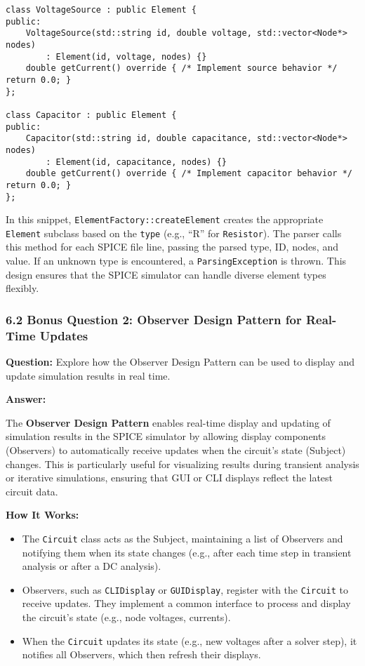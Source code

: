 \documentclass{article}
\begin{document}
\begin{itemize}
\begin{verbatim}
class VoltageSource : public Element {
public:
    VoltageSource(std::string id, double voltage, std::vector<Node*> nodes)
        : Element(id, voltage, nodes) {}
    double getCurrent() override { /* Implement source behavior */ return 0.0; }
};

class Capacitor : public Element {
public:
    Capacitor(std::string id, double capacitance, std::vector<Node*> nodes)
        : Element(id, capacitance, nodes) {}
    double getCurrent() override { /* Implement capacitor behavior */ return 0.0; }
};
\end{verbatim}

In this snippet, \texttt{ElementFactory::createElement} creates the appropriate \texttt{Element} subclass based on the \texttt{type} (e.g., “R” for \texttt{Resistor}). The parser calls this method for each SPICE file line, passing the parsed type, ID, nodes, and value. If an unknown type is encountered, a \texttt{ParsingException} is thrown. This design ensures that the SPICE simulator can handle diverse element types flexibly.

\subsubsection*{6.2 Bonus Question 2: Observer Design Pattern for Real-Time Updates}

\textbf{Question:} Explore how the Observer Design Pattern can be used to display and update simulation results in real time.

\textbf{Answer:}

The \textbf{Observer Design Pattern} enables real-time display and updating of simulation results in the SPICE simulator by allowing display components (Observers) to automatically receive updates when the circuit’s state (Subject) changes. This is particularly useful for visualizing results during transient analysis or iterative simulations, ensuring that GUI or CLI displays reflect the latest circuit data.

\textbf{How It Works:}
\begin{itemize}
    \item The \texttt{Circuit} class acts as the Subject, maintaining a list of Observers and notifying them when its state changes (e.g., after each time step in transient analysis or after a DC analysis).
    \item Observers, such as \texttt{CLIDisplay} or \texttt{GUIDisplay}, register with the \texttt{Circuit} to receive updates. They implement a common interface to process and display the circuit’s state (e.g., node voltages, currents).
    \item When the \texttt{Circuit} updates its state (e.g., new voltages after a solver step), it notifies all Observers, which then refresh their displays.
\end{itemize}


\end{itemize}
\end{document}
